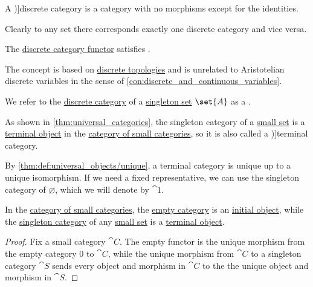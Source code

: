 \begin{definition}\label{def:discrete_category}
  A \term[ru=дискретная (категория) (\cite[15]{ЦаленкоШульгейфер1974ОсновыТеорииКатегорий})]{discrete category} is a category with no morphisms except for the identities.
\end{definition}
\begin{comments}
  \item Clearly to any set there corresponds exactly one discrete category and vice versa.

  \item The \hyperref[def:discrete_category_functor]{discrete category functor} satisfies .

  \item The concept is based on \hyperref[def:discrete_topology]{discrete topologies} and is unrelated to Aristotelian discrete variables in the sense of \cref{con:discrete_and_continuous_variables}.
\end{comments}

\begin{definition}\label{def:singleton_category}\mimprovised
  We refer to the \hyperref[def:discrete_category]{discrete category} of a \hyperref[def:singleton_set]{singleton set} \( \set{ A } \) as a .

  As shown in \cref{thm:universal_categories}, the singleton category of a \hyperref[def:small_set]{small set} is a \hyperref[def:universal_objects/terminal]{terminal object} in the \hyperref[def:category_of_small_categories]{category of small categories}, so it is also called a \term[en=terminal category (\cite[275]{MacLane1998CategoryTheory})]{terminal category}.

  By \cref{thm:def:universal_objects/unique}, a terminal category is unique up to a unique isomorphism. If we need a fixed representative, we can use the singleton category of \( \varnothing \), which we will denote by \( \cat{1} \).
\end{definition}

\begin{proposition}\label{thm:universal_categories}
  In the \hyperref[def:category_of_small_categories]{category of small categories}, the \hyperref[def:empty_category]{empty category} is an \hyperref[def:universal_objects/initial]{initial object}, while the \hyperref[def:singleton_category]{singleton category} of any \hyperref[def:small_set]{small set} is a \hyperref[def:universal_objects/terminal]{terminal object}.
\end{proposition}
\begin{proof}
  Fix a small category \( \cat{C} \). The empty functor is the unique morphism from the empty category \( 0 \) to \( \cat{C} \), while the unique morphism from \( \cat{C} \) to a singleton category \( \cat{S} \) sends every object and morphism in \( \cat{C} \) to the the unique object and morphism in \( \cat{S} \).
\end{proof}

